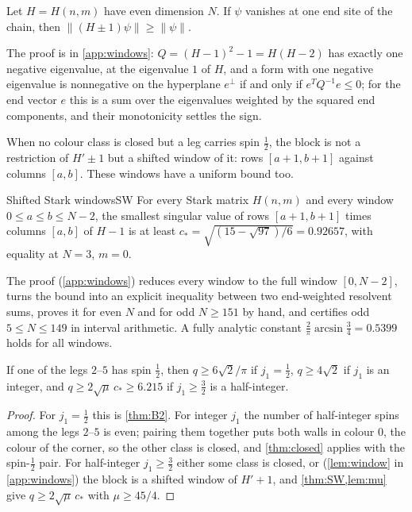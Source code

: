 \begin{lemma}\label{lem:onesided}
Let $H=H(n,m)$ have even dimension $N$. If $\psi$ vanishes at one end site of the
chain, then $\|(H\pm1)\psi\|\ge\|\psi\|$.
\end{lemma}

The proof is in \cref{app:windows}: $Q=(H-1)^2-1=H(H-2)$ has exactly one negative
eigenvalue, at the eigenvalue $1$ of $H$, and a form with one negative eigenvalue is
nonnegative on the hyperplane $e^\perp$ if and only if $e^TQ^{-1}e\le0$; for the end
vector $e$ this is a sum over the eigenvalues weighted by the squared end components,
and their monotonicity settles the sign.

When no colour class is closed but a leg carries spin $\frac12$, the block is not a
restriction of $H'\pm1$ but a shifted window of it: rows $[a+1,b+1]$ against columns
$[a,b]$. These windows have a uniform bound too.

\begin{theorem}{Shifted Stark windows}{SW}
For every Stark matrix $H(n,m)$ and every window $0\le a\le b\le N-2$, the smallest
singular value of rows $[a+1,b+1]$ times columns $[a,b]$ of $H-1$ is at least
$c_*=\sqrt{(15-\sqrt{97})/6}=0.92657$, with equality at $N=3$, $m=0$.
\end{theorem}

The proof (\cref{app:windows}) reduces every window to the full window $[0,N-2]$, turns
the bound into an explicit inequality between two end-weighted resolvent sums, proves it
for even $N$ and for odd $N\ge151$ by hand, and certifies odd $5\le N\le149$ in interval
arithmetic. A fully analytic constant $\frac2\pi\arcsin\frac34=0.5399$ holds for all
windows.

\begin{corollary}[Ladders]\label{cor:ladder}
If one of the legs $2$--$5$ has spin $\frac12$, then $q\ge6\sqrt2/\pi$ if $j_1=\frac12$,
$q\ge4\sqrt2$ if $j_1$ is an integer, and $q\ge2\sqrt\mu\,c_*\ge6.215$ if $j_1\ge\frac32$
is a half-integer.
\end{corollary}

\begin{proof}
For $j_1=\frac12$ this is \cref{thm:B2}. For integer $j_1$ the number of half-integer
spins among the legs $2$--$5$ is even; pairing them together puts both walls in colour
$0$, the colour of the corner, so the other class is closed, and \cref{thm:closed}
applies with the spin-$\frac12$ pair. For half-integer $j_1\ge\frac32$ either some class is
closed, or (\cref{lem:window} in \cref{app:windows}) the block is a shifted window of
$H'+1$, and \cref{thm:SW,lem:mu} give $q\ge2\sqrt\mu\,c_*$ with $\mu\ge45/4$.
\end{proof}

